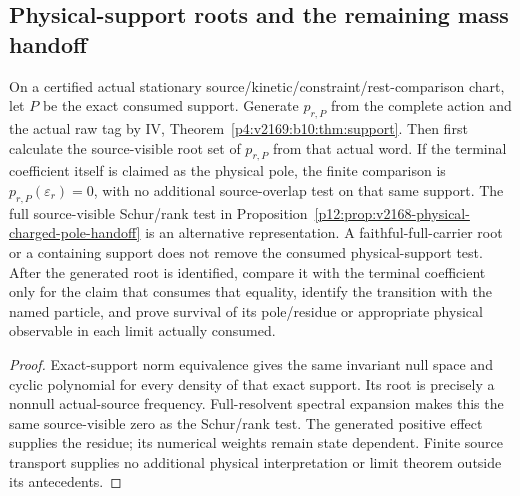 \documentclass[12pt,a4paper]{article}
\begin{document}





\subsection{Physical-support roots and the remaining mass handoff}
\label{p12:sec:v2169-support-handoff}

\begin{proposition}
\label{p12:prop:v2169-physical-support-root}
On a certified actual stationary source/kinetic/constraint/rest-comparison
chart, let $P$ be the exact consumed support. Generate $p_{r,P}$ from the
complete action and the actual raw tag by IV,
Theorem~\ref{p4:v2169:b10:thm:support}. Then first calculate the source-visible root set of $p_{r,P}$ from that
actual word.  If the terminal coefficient itself is claimed as the physical
pole, the finite comparison is $p_{r,P}(\varepsilon_r)=0$, with no
additional source-overlap test on that same support. The full source-visible Schur/rank test in
Proposition~\ref{p12:prop:v2168-physical-charged-pole-handoff} is an
alternative representation. A faithful-full-carrier root or a containing
support does not remove the consumed physical-support test.
After the generated root is identified, compare it with the terminal
coefficient only for the claim that consumes that equality, identify the
transition with the named particle, and prove survival of its pole/residue or
appropriate physical observable in each limit actually consumed.
\end{proposition}
\begin{proof}
Exact-support norm equivalence gives the same invariant null space and
cyclic polynomial for every density of that exact support. Its root is
precisely a nonnull actual-source frequency. Full-resolvent spectral
expansion makes this the same source-visible zero as the Schur/rank test.
The generated positive effect supplies the residue; its numerical weights
remain state dependent. Finite source transport supplies no additional
physical interpretation or limit theorem outside its antecedents.
\end{proof}
\end{document}
